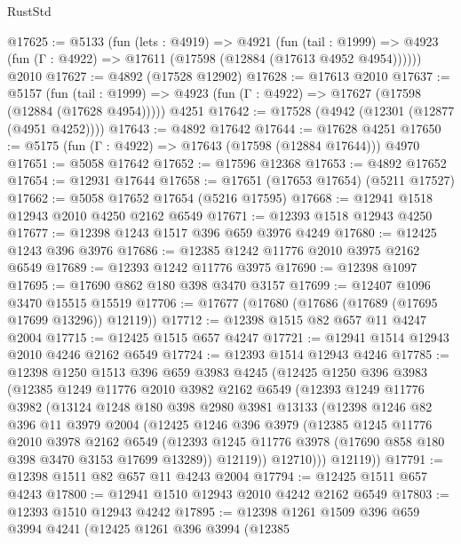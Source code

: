 \begin{lexlean}{RustStd}
\begin{coremodule}
@17625 := @5133
    (fun (lets : @4919) =>
    @4921
      (fun (tail : @1999) =>
      @4923 (fun (Γ : @4922) => @17611 (@17598 (@12884 (@17613 @4952 @4954))))))
    @2010
@17627 := @4892 (@17528 @12902)
@17628 := @17613 @2010
@17637 := @5157
    (fun (tail : @1999) => @4923 (fun (Γ : @4922) => @17627 (@17598 (@12884 (@17628 @4954)))))
    @4251
@17642 := @17528 (@4942 (@12301 (@12877 (@4951 @4252))))
@17643 := @4892 @17642
@17644 := @17628 @4251
@17650 := @5175 (fun (Γ : @4922) => @17643 (@17598 (@12884 @17644))) @4970
@17651 := @5058 @17642
@17652 := @17596 @12368
@17653 := @4892 @17652
@17654 := @12931 @17644
@17658 := @17651 (@17653 @17654) (@5211 @17527)
@17662 := @5058 @17652 @17654 (@5216 @17595)
@17668 := @12941 @1518 @12943 @2010 @4250 @2162 @6549
@17671 := @12393 @1518 @12943 @4250
@17677 := @12398 @1243 @1517 @396 @659 @3976 @4249
@17680 := @12425 @1243 @396 @3976
@17686 := @12385 @1242 @11776 @2010 @3975 @2162 @6549
@17689 := @12393 @1242 @11776 @3975
@17690 := @12398 @1097
@17695 := @17690 @862 @180 @398 @3470 @3157
@17699 := @12407 @1096 @3470 @15515 @15519
@17706 := @17677 (@17680 (@17686 (@17689 (@17695 @17699 @13296)) @12119))
@17712 := @12398 @1515 @82 @657 @11 @4247 @2004
@17715 := @12425 @1515 @657 @4247
@17721 := @12941 @1514 @12943 @2010 @4246 @2162 @6549
@17724 := @12393 @1514 @12943 @4246
@17785 := @12398
    @1250
    @1513
    @396
    @659
    @3983
    @4245
    (@12425
      @1250
      @396
      @3983
      (@12385
        @1249
        @11776
        @2010
        @3982
        @2162
        @6549
        (@12393
          @1249
          @11776
          @3982
          (@13124
            @1248
            @180
            @398
            @2980
            @3981
            @13133
            (@12398
              @1246
              @82
              @396
              @11
              @3979
              @2004
              (@12425
                @1246
                @396
                @3979
                (@12385
                  @1245
                  @11776
                  @2010
                  @3978
                  @2162
                  @6549
                  (@12393 @1245 @11776 @3978 (@17690 @858 @180 @398 @3470 @3153 @17699 @13289))
                  @12119))
              @12710)))
        @12119))
@17791 := @12398 @1511 @82 @657 @11 @4243 @2004
@17794 := @12425 @1511 @657 @4243
@17800 := @12941 @1510 @12943 @2010 @4242 @2162 @6549
@17803 := @12393 @1510 @12943 @4242
@17895 := @12398
    @1261
    @1509
    @396
    @659
    @3994
    @4241
    (@12425
      @1261
      @396
      @3994
      (@12385

\end{coremodule}
\end{lexlean}
